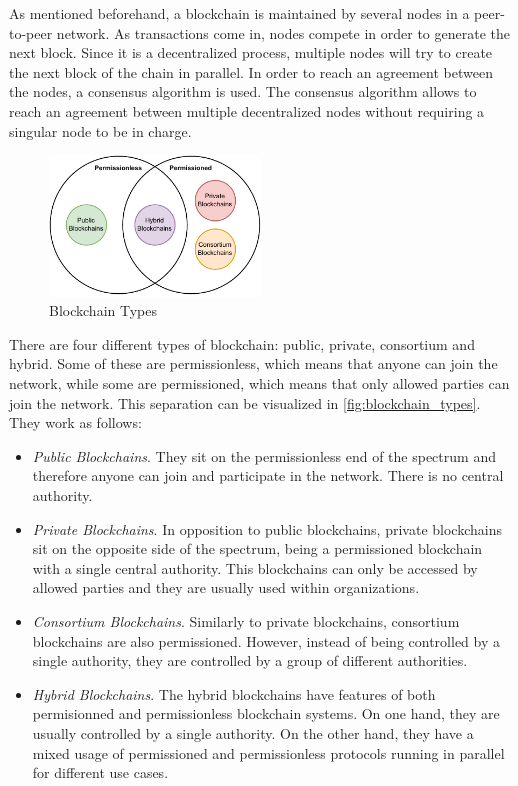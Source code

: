 As mentioned beforehand, a blockchain is maintained by several nodes in a peer-to-peer network. As transactions come in, nodes compete in order to generate the next block. Since it is a decentralized process, multiple nodes will try to create the next block of the chain in parallel. In order to reach an agreement between the nodes, a consensus algorithm is used. The consensus algorithm allows to reach an agreement between multiple decentralized nodes without requiring a singular node to be in charge.

\begin{figure}[h]
    \centering
    \includegraphics[width=0.5\textwidth]{graphics/blockchain-types.pdf}
    \caption{Blockchain Types}
    \label{fig:blockchain_types}
\end{figure}

There are four different types of blockchain: public, private, consortium and hybrid. Some of these are permissionless, which means that anyone can join the network, while some are permissioned, which means that only allowed parties can join the network. This separation can be visualized in \autoref{fig:blockchain_types}. They work as follows:

\begin{itemize}
    \item \textit{Public Blockchains}. They sit on the permissionless end of the spectrum and therefore anyone can join and participate in the network. There is no central authority.

    \item \textit{Private Blockchains}. In opposition to public blockchains, private blockchains sit on the opposite side of the spectrum, being a permissioned blockchain with a single central authority. This blockchains can only be accessed by allowed parties and they are usually used within organizations.

    \item \textit{Consortium Blockchains}. Similarly to private blockchains, consortium blockchains are also permissioned. However, instead of being controlled by a single authority, they are controlled by a group of different authorities.

    \item \textit{Hybrid Blockchains}. The hybrid blockchains have features of both permisionned and permissionless blockchain systems. On one hand, they are usually controlled by a single authority. On the other hand, they have a mixed usage of permissioned and permissionless protocols running in parallel for different use cases.
\end{itemize}

